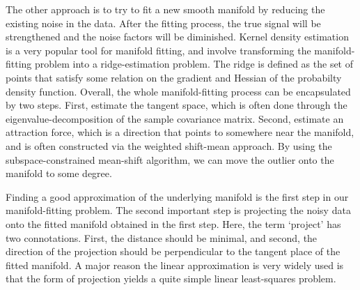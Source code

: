 \documentclass{article}
\theoremstyle{remark}
\begin{document}
The other approach is to try to fit a new smooth manifold by reducing the existing noise in the data. After the fitting process, the true signal will be strengthened and the noise factors will be diminished. Kernel density estimation \cite{genovese2014nonparametric,ozertem2011locally} is a very popular tool for manifold fitting, and involve transforming the manifold-fitting problem into a ridge-estimation problem. The ridge is defined as the set of points that satisfy some relation on the gradient and Hessian of the probabilty density function. Overall, the whole manifold-fitting process can be encapsulated  by two steps. First, estimate the tangent space, which is often done through the eigenvalue-decomposition of the sample covariance matrix. Second,  estimate an attraction force, which is a  direction that points to somewhere near the manifold, and is often constructed via the weighted shift-mean approach. By using the subspace-constrained mean-shift algorithm, we can move the outlier onto the manifold to some degree.
 

Finding a good approximation of the underlying manifold is the first step in our manifold-fitting problem. The second important step is projecting the noisy data onto the fitted manifold obtained in the first step. Here, the term `project' has two connotations. First, the distance should be minimal, and second, the direction of the projection should be perpendicular to the tangent place of the fitted manifold. A major reason  the linear approximation is very widely used is that the form of projection yields a quite simple linear least-squares problem.


\end{document}
